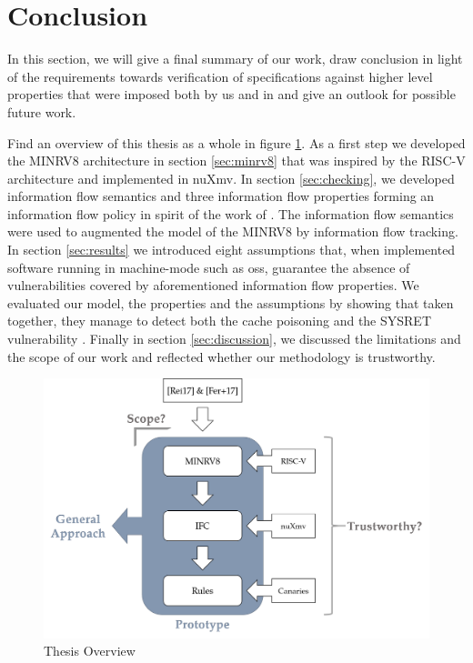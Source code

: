 
\section{Conclusion}
\label{sec:conclusion}

In this section, we will give a final summary of our work, draw conclusion in light of the requirements towards verification of specifications against higher level properties that were imposed both by us and \citeauthor{Reid17} in \cite{Reid17} and give an outlook for possible future work.

Find an overview of this thesis as a whole in figure \ref{fig:overview}.
As a first step we developed the MINRV8 architecture in section \ref{sec:minrv8} that was inspired by the RISC-V architecture and implemented in nuXmv.
In section \ref{sec:checking}, we developed information flow semantics and three information flow properties forming an information flow policy in spirit of the work of \citeauthor{Ferraiuolo17} \cite{Ferraiuolo17}.
The information flow semantics were used to augmented the model of the MINRV8 by information flow tracking.
In section \ref{sec:results} we introduced eight assumptions that, when implemented software running in machine-mode such as \glspl{os}, guarantee the absence of vulnerabilities covered by aforementioned information flow properties.
We evaluated our model, the properties and the assumptions by showing that taken together, they manage to detect both the cache poisoning \cite{Wojtczuk09} and the SYSRET vulnerability \cite{Dunlap19}.
Finally in section \ref{sec:discussion}, we discussed the limitations and the scope of our work and reflected whether our methodology is trustworthy.

\begin{figure}
    \centering
    \includegraphics[width=\textwidth]{figures/thesis-overview.png}
    \caption{Thesis Overview}
    \label{fig:overview}
\end{figure}

